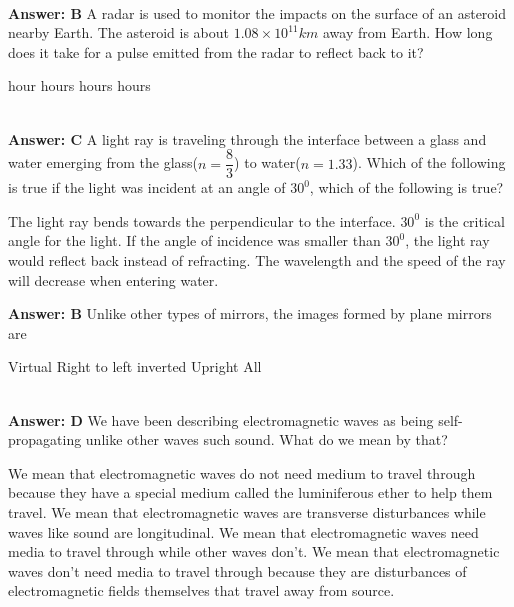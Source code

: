 \documentclass[12pt,addpoints]{exam}
\begin{document}
{{{\begin{questions}
\begin{oneparchoices}
					\end{oneparchoices}
					\\ \textbf{Answer: B}
					\question A radar is used to monitor the impacts on the surface of an asteroid nearby Earth. The asteroid is about $1.08\times10^{11}km$ away from Earth. How long does it take for a pulse emitted from the radar to reflect back to it?\\
					\begin{oneparchoices}
						 hour
						 hours
						 hours
						 hours
					\end{oneparchoices}
					\\ \textbf{Answer: C}
					\question A light ray is traveling through the interface between a glass and water emerging from the glass($n=\dfrac{8}{3}$) to water($n=1.33$). Which of the following is true if the light was incident at an angle of $30^0$, which of the following is true?
					\begin{choices}
						\choice The light ray bends towards the perpendicular to the interface.
						\choice $30^0$ is the critical angle for the light.
						\choice If the angle of incidence was smaller than $30^0$, the light ray would reflect back instead of refracting.
						\choice The wavelength and the speed of the ray will decrease when entering water.
					\end{choices}
					\textbf{Answer: B}
					\question Unlike other types of mirrors, the images formed by plane mirrors are \\
					\begin{oneparchoices}
						\choice Virtual
						\choice Right to left inverted
						\choice Upright
						\choice All
					\end{oneparchoices}
					\\ \textbf{Answer: D}
					\question We have been describing electromagnetic waves as being self-propagating unlike other waves such sound. What do we mean by that?
					\begin{choices}
						\choice We mean that electromagnetic waves do not need medium to travel through because they have a special medium called the luminiferous ether to help them travel.
						\choice We mean that electromagnetic waves are transverse disturbances while waves like sound are longitudinal.
						\choice We mean that electromagnetic waves need media to travel through while other waves don't.
						\choice We mean that electromagnetic waves don't need media to travel through because they are disturbances of electromagnetic fields themselves that travel away from source.

\end{choices}
\end{questions}}}}
\end{document}
